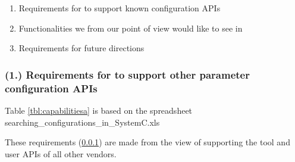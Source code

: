 \begin{enumerate}
	\item Requirements for \GreenConfig to support known configuration APIs 
	\item Functionalities we from our point of view would like to see in \GreenConfig  
	\item Requirements for future directions 
\end{enumerate}



\subsubsection[(1.) Requirements to support other parameter configuration APIs]{(1.) Requirements for \GreenConfig to support other parameter configuration APIs}
\label{lab:requ1}
Table \ref{tbl:capabilitiesa} is based on the spreadsheet searching\_configurations\_in\_SystemC.xls 

These requirements (\ref{lab:requ1}) are made from the view of supporting the tool and user APIs of all other vendors. 

